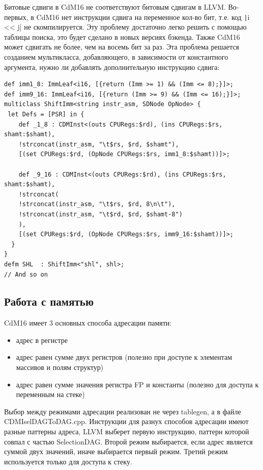 \documentclass[a4paper,14pt]{extarticle}
\begin{document}
Битовые сдвиги в CdM16 не соответствуют битовым сдвигам в LLVM. Во-первых, в CdM16 нет инструкции сдвига на переменное кол-во бит, т.е. код \texttt|i << j| не скомпилируется. Эту проблему достаточно легко решить с помощью таблицы поиска, это будет сделано в новых версиях бэкенда. Также CdM16 может сдвигать не более, чем на восемь бит за раз. Эта проблема решается созданием мультикласса, добавляющего, в зависимости от константного аргумента, нужно ли добавлять дополнительную инструкцию сдвига:
\begin{verbatim}
def imm1_8: ImmLeaf<i16, [{return (Imm >= 1) && (Imm <= 8);}]>;
def imm9_16: ImmLeaf<i16, [{return (Imm >= 9) && (Imm <= 16);}]>;
multiclass ShiftImm<string instr_asm, SDNode OpNode> {
 let Defs = [PSR] in {
	def _1_8 : CDMInst<(outs CPURegs:$rd), (ins CPURegs:$rs, shamt:$shamt),
	!strconcat(instr_asm, "\t$rs, $rd, $shamt"),
	[(set CPURegs:$rd, (OpNode CPURegs:$rs, imm1_8:$shamt))]>;
	
	def _9_16 : CDMInst<(outs CPURegs:$rd), (ins CPURegs:$rs, shamt:$shamt),
	!strconcat(
	!strconcat(instr_asm, "\t$rs, $rd, 8\n\t"),
	!strconcat(instr_asm, "\t$rd, $rd, $shamt-8")
	),
	[(set CPURegs:$rd, (OpNode CPURegs:$rs, imm9_16:$shamt))]>;
  }
}
defm SHL  : ShiftImm<"shl", shl>;
// And so on
\end{verbatim}

\subsection{Работа с памятью}
CdM16 имеет 3 основных способа адресации памяти:
\begin{itemize}
	\item адрес в регистре
	\item адрес равен сумме двух регистров (полезно при доступе к элементам массивов и полям структур)
	\item адрес равен сумме значения регистра FP и константы (полезно для доступа к переменным на стеке)
\end{itemize}

Выбор между режимами адресации реализован не через tablegen, а в файле CDMIselDAGToDAG.cpp. Инструкции для разнух способов адресации имеют разные паттерны адреса, LLVM выберет первую инструкцию, паттерн которой совпал с частью SelectionDAG. Второй режим выбирается, если %
адрес является суммой двух значений, иначе выбирается первый режим. Третий режим используется только для доступа к стеку.
\end{document}
